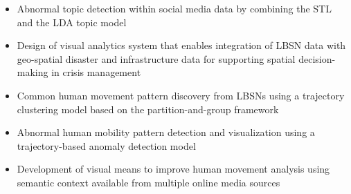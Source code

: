 \begin{itemize}
	\item Abnormal topic detection within social media data by combining the STL and the LDA topic model
	\item Design of visual analytics system that enables integration of LBSN data with geo-spatial disaster and infrastructure data for supporting spatial decision-making in crisis management
	\item Common human movement pattern discovery from LBSNs using a trajectory clustering model based on the partition-and-group framework
	\item Abnormal human mobility pattern detection and visualization using a trajectory-based anomaly detection model
	\item Development of visual means to improve human movement analysis using semantic context available from multiple online media sources
\end{itemize}

